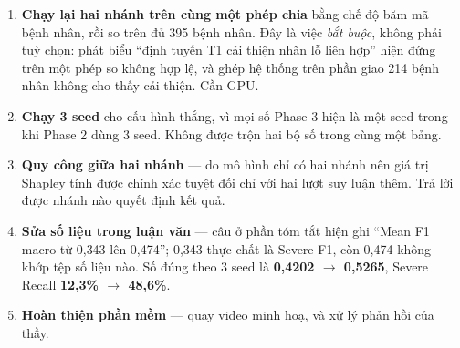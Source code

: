 \documentclass[11pt,a4paper]{article}
\begin{document}
\begin{enumerate}
\itemsep0.15em
\item \textbf{Chạy lại hai nhánh trên cùng một phép chia} bằng chế độ băm mã bệnh nhân, rồi so
trên đủ 395 bệnh nhân. Đây là việc \emph{bắt buộc}, không phải tuỳ chọn: phát biểu ``định tuyến T1
cải thiện nhãn lỗ liên hợp'' hiện đứng trên một phép so không hợp lệ, và ghép hệ thống trên phần
giao 214 bệnh nhân không cho thấy cải thiện. Cần GPU.
\item \textbf{Chạy 3 seed} cho cấu hình thắng, vì mọi số Phase 3 hiện là một seed trong khi Phase 2
dùng 3 seed. Không được trộn hai bộ số trong cùng một bảng.
\item \textbf{Quy công giữa hai nhánh} --- do mô hình chỉ có hai nhánh nên giá trị Shapley tính được
chính xác tuyệt đối chỉ với hai lượt suy luận thêm. Trả lời được nhánh nào quyết định kết quả.
\item \textbf{Sửa số liệu trong luận văn} --- câu ở phần tóm tắt hiện ghi ``Mean F1 macro từ 0{,}343
lên 0{,}474''; 0{,}343 thực chất là Severe F1, còn 0{,}474 không khớp tệp số liệu nào. Số đúng theo
3 seed là \textbf{0{,}4202 $\to$ 0{,}5265}, Severe Recall \textbf{12{,}3\% $\to$ 48{,}6\%}.
\item \textbf{Hoàn thiện phần mềm} --- quay video minh hoạ, và xử lý phản hồi của thầy.
\end{enumerate}
\end{document}
